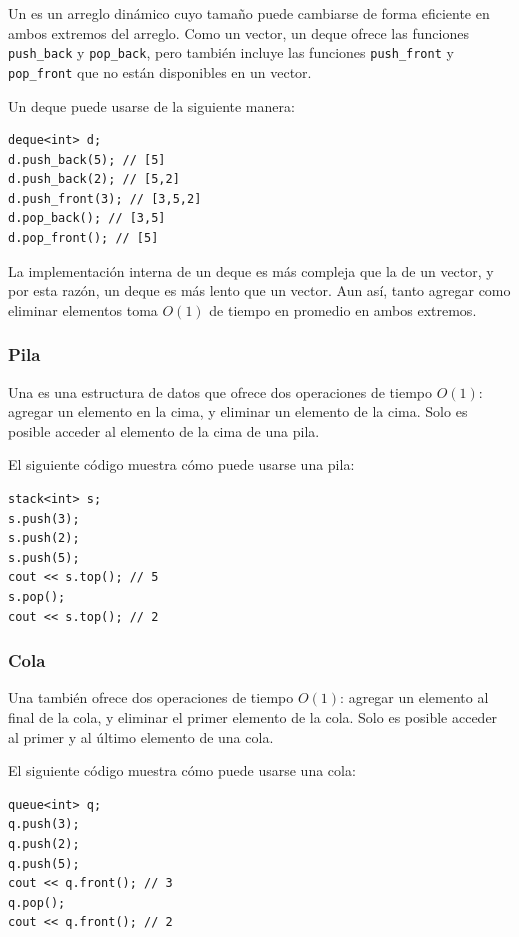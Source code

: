 
Un  es un arreglo dinámico
cuyo tamaño puede cambiarse de forma eficiente
en ambos extremos del arreglo.
Como un vector, un deque ofrece las funciones
\texttt{push\_back} y \texttt{pop\_back}, pero
también incluye las funciones
\texttt{push\_front} y \texttt{pop\_front}
que no están disponibles en un vector.

Un deque puede usarse de la siguiente manera:
\begin{lstlisting}
deque<int> d;
d.push_back(5); // [5]
d.push_back(2); // [5,2]
d.push_front(3); // [3,5,2]
d.pop_back(); // [3,5]
d.pop_front(); // [5]
\end{lstlisting}

La implementación interna de un deque
es más compleja que la de un vector,
y por esta razón, un deque es más lento que un vector.
Aun así, tanto agregar como eliminar
elementos toma $O(1)$ de tiempo en promedio en ambos extremos.

\subsubsection{Pila}


Una 
es una estructura de datos que ofrece dos
operaciones de tiempo $O(1)$:
agregar un elemento en la cima,
y eliminar un elemento de la cima.
Solo es posible acceder al elemento
de la cima de una pila.

El siguiente código muestra cómo puede usarse una pila:
\begin{lstlisting}
stack<int> s;
s.push(3);
s.push(2);
s.push(5);
cout << s.top(); // 5
s.pop();
cout << s.top(); // 2
\end{lstlisting}
\subsubsection{Cola}


Una  también
ofrece dos operaciones de tiempo $O(1)$:
agregar un elemento al final de la cola,
y eliminar el primer elemento de la cola.
Solo es posible acceder al primer
y al último elemento de una cola.

El siguiente código muestra cómo puede usarse una cola:
\begin{lstlisting}
queue<int> q;
q.push(3);
q.push(2);
q.push(5);
cout << q.front(); // 3
q.pop();
cout << q.front(); // 2
\end{lstlisting}

